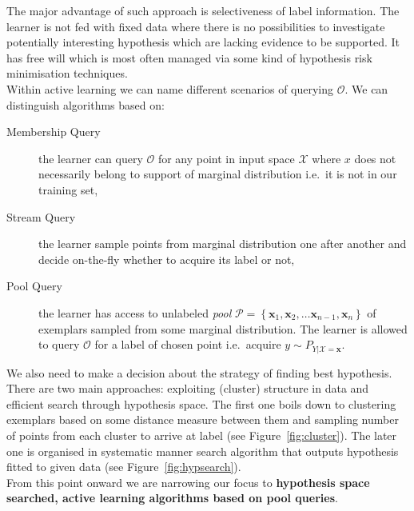\documentclass[12pt, a4paper, pdflatex]{report}
\begin{document}
The major advantage of such approach is selectiveness of label information. The learner is not fed with fixed data where there is no possibilities to investigate potentially interesting hypothesis which are lacking evidence to be supported. It has free will which is most often managed via some kind of hypothesis risk minimisation techniques.\\

Within active learning we can name different scenarios of querying $\mathscr{O}$. We can distinguish algorithms based on:
\begin{description}
\item[Membership Query] the learner can query $\mathscr{O}$ for any point in input space $\mathscr{X}$ where $x$ does not necessarily belong to support of marginal distribution i.e.\ it is not in our training set,
\item[Stream Query] the learner sample points from marginal distribution one after another and decide on-the-fly whether to acquire its label or not,
\item[Pool Query] the learner has access to unlabeled \emph{pool} $\mathscr{P} = \left\{ \mathbf{x}_1, \mathbf{x}_2, \dots \mathbf{x}_{n-1}, \mathbf{x}_n \right\}$ of exemplars sampled from some marginal distribution. The learner is allowed to query $\mathscr{O}$ for a label of chosen point i.e.\ acquire $y \sim P_{Y|\mathscr{X} = \mathbf{x}}$.\\
\end{description}

We also need to make a decision about the strategy of finding best hypothesis. There are two main approaches: exploiting (cluster) structure in data and efficient search through hypothesis space. The first one boils down to clustering exemplars based on some distance measure between them and sampling number of points from each cluster to arrive at label (see Figure~\ref{fig:cluster}). The later one is organised in systematic manner search algorithm that outputs hypothesis fitted to given data (see Figure~\ref{fig:hypsearch}).\\

From this point onward we are narrowing our focus to \textbf{hypothesis space searched, active learning algorithms based on pool queries}.\\
\end{document}
